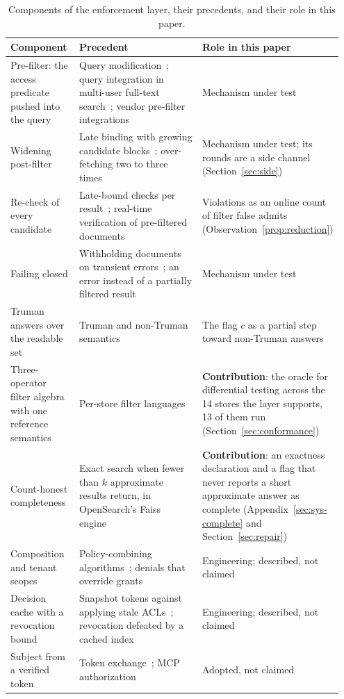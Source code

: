 \begin{table}[tbp]
\centering
\scriptsize
\newcommand{\sysrag}{\raggedright}
\setlength{\tabcolsep}{4pt}
\begin{tabular}{@{}p{0.21\linewidth}p{0.44\linewidth}p{0.3\linewidth}@{}}
\toprule
Component & Precedent & Role in this paper \\
\midrule
\sysrag Pre-filter: the access predicate pushed into the query
 & \sysrag Query modification~\cite{stonebraker1974access}; query integration in multi-user
   full-text search~\cite{buttcher2005security}; vendor pre-filter
   integrations~\cite{cerbos2026implementing,authzed2026langchainspicedb}
 & \sysrag Mechanism under test \tabularnewline
\sysrag Widening post-filter
 & \sysrag Late binding with growing candidate blocks~\cite{bailey2006secure,mangtani2006documentlevel};
   over-fetching two to three times~\cite{openfga2026rag}
 & \sysrag Mechanism under test; its rounds are a side channel (Section~\ref{sec:side}) \tabularnewline
\sysrag Re-check of every candidate
 & \sysrag Late-bound checks per result~\cite{pang2019zanzibar}; real-time verification of
   pre-filtered documents~\cite{aws2026access}
 & \sysrag Violations as an online count of filter false admits (Observation~\ref{prop:reduction}) \tabularnewline
\sysrag Failing closed
 & \sysrag Withholding documents on transient errors~\cite{aws2026access}; an error instead of a
   partially filtered result~\cite{microsoft2026querytime}
 & \sysrag Mechanism under test \tabularnewline
\sysrag Truman answers over the readable set
 & \sysrag Truman and non-Truman semantics~\cite{rizvi2004extending}
 & \sysrag The flag $c$ as a partial step toward non-Truman answers \tabularnewline
\sysrag Three-operator filter algebra with one reference semantics
 & \sysrag Per-store filter languages
 & \sysrag \textbf{Contribution}: the oracle for differential testing across the 14 stores the layer
   supports, 13 of them run (Section~\ref{sec:conformance}) \tabularnewline
\sysrag Count-honest completeness
 & \sysrag Exact search when fewer than $k$ approximate results return, in OpenSearch's Faiss engine~\cite{opensearch2026efficient}
 & \sysrag \textbf{Contribution}: an exactness declaration and a flag that never reports a short
   approximate answer as complete (Appendix~\ref{sec:sys-complete} and Section~\ref{sec:repair}) \tabularnewline
\sysrag Composition and tenant scopes
 & \sysrag Policy-combining algorithms~\cite{oasis2013extensible}; denials that override
   grants~\cite{aws2026access}
 & \sysrag Engineering; described, not claimed \tabularnewline
\sysrag Decision cache with a revocation bound
 & \sysrag Snapshot tokens against applying stale ACLs~\cite{pang2019zanzibar}; revocation defeated
   by a cached index~\cite{roychowdhury2024confusedpilot}
 & \sysrag Engineering; described, not claimed \tabularnewline
\sysrag Subject from a verified token
 & \sysrag Token exchange~\cite{jones2020oauth}; MCP authorization~\cite{mcp2026model}
 & \sysrag Adopted, not claimed \tabularnewline
\bottomrule
\end{tabular}
\caption{Components of the enforcement layer, their precedents, and their role in this paper.}
\label{tab:sys-precedents}
\end{table}

